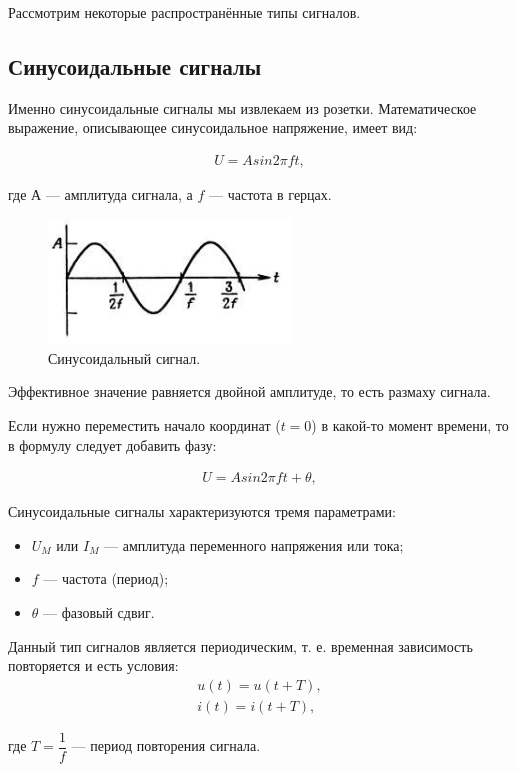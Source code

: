 	Рассмотрим некоторые распространённые типы сигналов.
\subsection{Синусоидальные сигналы}
	Именно синусоидальные сигналы мы извлекаем из розетки. Математическое выражение, описывающее синусоидальное напряжение, имеет вид:
	
	\begin{gather}
	U=A sin2 \pi ft,
	\end{gather}
	
	где А --- амплитуда сигнала, а $f$ --- частота в герцах.

	\begin{figure}[H]
    \centering
    \includegraphics[width=0.575\textwidth]{../image/s_sin.png}
    \caption{Синусоидальный сигнал.}
	\end{figure}
	Эффективное значение равняется двойной амплитуде, то есть размаху сигнала. 

	Если нужно переместить начало координат ($t=0$) в какой-то момент времени, то в формулу следует добавить фазу:

	\begin{gather}
	U=A sin2 \pi ft + \theta,
	\end{gather}

	Синусоидальные сигналы характеризуются тремя параметрами:
	\begin{itemize}
		\item $U_{M}$ или $I_{M}$ --- амплитуда переменного напряжения или тока;
		\item $f$ --- частота (период);
		\item $\theta$ --- фазовый сдвиг.
	\end{itemize}

	Данный тип сигналов является периодическим, т. е. временная зависимость повторяется и есть условия:
	\begin{gather}
	u(t)=u(t+T),\\
	i(t)=i(t+T), 
	\end{gather}
	
	где $T=\dfrac{1}{f}$ --- период повторения сигнала.

